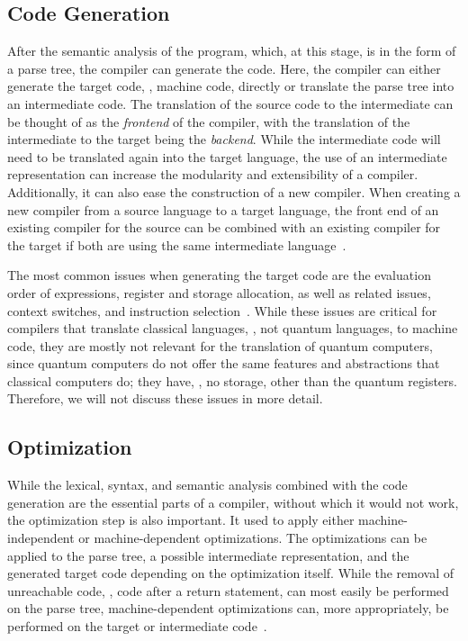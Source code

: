 \subsection{Code Generation}
\label{sec:background_codeGeneration}
After the semantic analysis of the program, which, at this stage, is in the form of a parse tree, the compiler can generate the code. Here, the compiler can either generate the target code, \eg, machine code, directly or translate the parse tree into an intermediate code.
The translation of the source code to the intermediate can be thought of as the \emph{frontend} of the compiler, with the translation of the intermediate to the target being the \emph{backend}. While the intermediate code will need to be translated again into the target language, the use of an intermediate representation can increase the modularity and extensibility of a compiler. Additionally, it can also ease the construction of a new compiler. When creating a new compiler from a source language to a target language, the front end of an existing compiler for the source can be combined with an existing compiler for the target if both are using the same intermediate language~\cite{VSSD07, GFH82}.

The most common issues when generating the target code are the evaluation order of expressions, register and storage allocation, as well as related issues, context switches, and instruction selection~\cite{GFH82}. While these issues are critical for compilers that translate classical languages, \ie, not quantum languages, to machine code, they are mostly not relevant for the translation of quantum computers, since quantum computers do not offer the same features and abstractions that classical computers do; they have, \eg, no storage, other than the quantum registers.
Therefore, we will not discuss these issues in more detail.

\subsection{Optimization}
\label{sec:background_codeOptimization}
While the lexical, syntax, and semantic analysis combined with the code generation are the essential parts of a compiler, without which it would not work, the optimization step is also important. It used to apply either machine-independent or machine-dependent optimizations. The optimizations can be applied to the parse tree, a possible intermediate representation, and the generated target code depending on the optimization itself. While the removal of unreachable code, \eg, code after a return statement, can most easily be performed on the parse tree, machine-dependent optimizations can, more appropriately, be performed on the target or intermediate code~\cite{Oliv07,VSSD07}.

